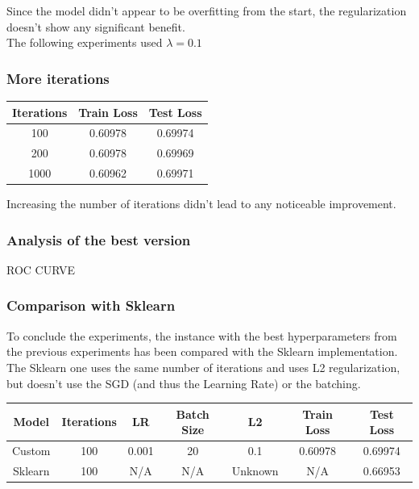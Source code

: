 \documentclass[
	letterpaper, %
	10pt, %
]{class}
\begin{document}
Since the model didn't appear to be overfitting from the start, the regularization doesn't show any significant benefit.\\
The following experiments used $\lambda = 0.1$

\subsubsection{More iterations}

\begin{center}
  \begin{tabular}{ |c|c|c| }
    \hline
    Iterations & Train Loss & Test Loss \\
    \hline
    100        & 0.60978    & 0.69974   \\
    200        & 0.60978    & 0.69969   \\
    1000       & 0.60962    & 0.69971   \\
    \hline
  \end{tabular}
\end{center}

Increasing the number of iterations didn't lead to any noticeable improvement.

\subsubsection{Analysis of the best version}
ROC CURVE

\subsubsection{Comparison with Sklearn}

To conclude the experiments, the instance with the best hyperparameters from the previous experiments has been compared with the Sklearn implementation.\\

The Sklearn one uses the same number of iterations and uses L2 regularization, but doesn't use the SGD (and thus the Learning Rate) or the batching.

\begin{center}
  \begin{tabular}{ |c|c|c|c|c|c|c| }
    \hline
    Model   & Iterations & LR    & Batch Size & L2      & Train Loss & Test Loss \\
    \hline
    Custom  & 100        & 0.001 & 20         & 0.1     & 0.60978    & 0.69974   \\
    Sklearn & 100        & N/A   & N/A        & Unknown & N/A        & 0.66953   \\
    \hline
  \end{tabular}
\end{center}
\end{document}
